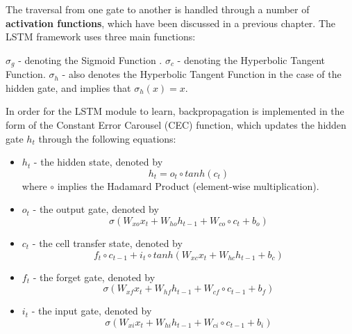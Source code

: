 The traversal from one gate to another is handled through a number of \textbf{activation functions}, which have been discussed in a previous chapter. The LSTM framework uses three main functions:

{$\sigma _{g}$} - denoting the Sigmoid Function \citep{DavidE.Rumelhart1986Lrbb}.
{$\sigma _{c}$} - denoting the Hyperbolic Tangent Function.
{$\sigma _{h}$} - also denotes the Hyperbolic Tangent Function in the case of the hidden gate, and implies that {$\sigma _{h}(x)=x$}.

In order for the LSTM module to learn, backpropagation is implemented in the form of the Constant Error Carousel (CEC) function, which updates the hidden gate {$h_{t}$} through the following equations:

\begin{itemize}
	\setlength{\itemsep}{1pt}
	\setlength{\parskip}{0pt}
	\setlength{\parsep}{0pt}
	\item {$h_{t}$} -  the hidden state, denoted by 
	\begin{equation} \label{LSTM CEC}
	h_{t} = o_{t} \circ tanh(c_{t})
	\end{equation}
	where {$\circ$} implies the Hadamard Product (element-wise multiplication).
	\item {$o_{t}$} - the output gate, denoted by 
	\begin{equation} \label{output gate equation}
		\sigma(W_{xo}x_{t} + W_{ho}h_{t-1} + W_{co} \circ c_{t} + b_{o})
	\end{equation}
	\item {$c_{t}$} - the cell transfer state, denoted by 
	\begin{equation} \label{cell state equation}
		f_{t} \circ c_{t-1}+ i_{t} \circ tanh(W_{xc}x_{t} + W_{hc}h_{t-1} + b_{c})
	\end{equation}
	\item {$f_{t}$} - the forget gate, denoted by 
	\begin{equation} \label{forget gate equation}
		\sigma(W_{xf}x_{t} + W_{hf}h_{t-1} + W_{cf} \circ c_{t-1} + b_{f})
	\end{equation}
	\item {$i_{t}$} - the input gate, denoted by 
	\begin{equation} \label{input gate equation}
		\sigma(W_{xi}x_{t} + W_{hi}h_{t-1} + W_{ci} \circ c_{t-1} + b_{i})
	\end{equation}
	
\end{itemize}


